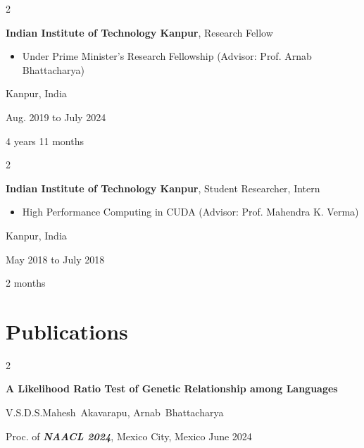 \documentclass[12pt, letterpaper]{article}
\newenvironment{highlights}{
    \begin{itemize}[
        topsep=0.10 cm,
        parsep=0.10 cm,
        partopsep=0pt,
        itemsep=0pt,
        leftmargin=0.4 cm + 10pt
    ]
}{
    \end{itemize}
} %
\newenvironment{twocolentry}[2][]{
    \onecolentry
    \def\secondColumn{#2}
    \setcolumnwidth{\fill, 4.5 cm}
    \begin{paracol}{2}
}{
    \switchcolumn \raggedleft \secondColumn
    \end{paracol}
    \endonecolentry
} %
\begin{document}
        
        \begin{twocolentry}{
            Kanpur, India

        Aug. 2019 to July 2024

        4 years 11 months
        }
            \textbf{Indian Institute of Technology Kanpur}, Research Fellow
            \begin{highlights}
                \item Under Prime Minister's Research Fellowship (Advisor: Prof. Arnab Bhattacharya)
            \end{highlights}
        \end{twocolentry}


        \vspace{0.2 cm}

        \begin{twocolentry}{
            Kanpur, India

        May 2018 to July 2018

        2 months
        }
            \textbf{Indian Institute of Technology Kanpur}, Student Researcher, Intern
            \begin{highlights}
                \item High Performance Computing in CUDA (Advisor: Prof. Mahendra K. Verma)
            \end{highlights}
        \end{twocolentry}



    
    \section{Publications}



        
        \begin{samepage}
            \begin{twocolentry}{
                June 2024
            }
                \textbf{A Likelihood Ratio Test of Genetic Relationship among Languages}

                \vspace{0.10 cm}

                \mbox{V.S.D.S.Mahesh Akavarapu}, \mbox{Arnab Bhattacharya}
                \vspace{0.10 cm}

        Proc. of \textbf{\textit{NAACL 2024}}, Mexico City, Mexico    \end{twocolentry}
        \end{samepage}
\end{document}

